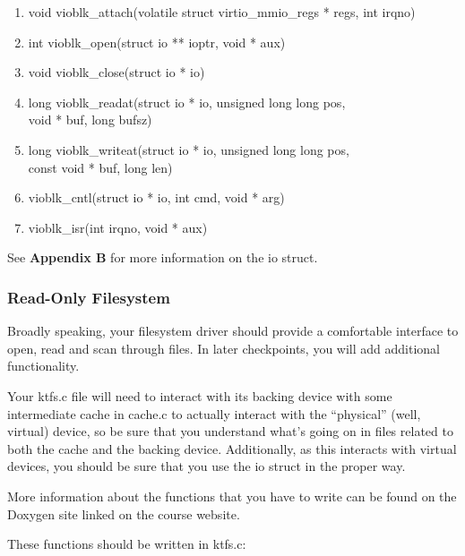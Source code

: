 \documentclass{article}
\begin{document}
	\begin{enumerate}

		\item{{\fix void vioblk\_attach(volatile struct virtio\_mmio\_regs * regs, int irqno)}}

		\item{{\fix int vioblk\_open(struct io ** ioptr, void * aux)}}

		\item{{\fix void vioblk\_close(struct io * io)}}

		\item{{\fix long vioblk\_readat(struct io * io, unsigned long long pos, \\
			void * buf, long bufsz)}}

		\item{{\fix long vioblk\_writeat(struct io * io, unsigned long long pos, \\
			const void * buf, long len)}}

		\item {{\fix vioblk\_cntl(struct io * io, int cmd, void * arg)}}

		\item{{\fix vioblk\_isr(int irqno, void * aux)}}

	\end{enumerate}

	See \textbf{Appendix B} for more information on the {\fix io} struct.

	\subsubsection{Read-Only Filesystem}
	Broadly speaking, your filesystem driver should provide a comfortable interface to open, read
	and scan through files. In later checkpoints, you will add additional functionality.

	Your {\fix ktfs.c} file will need to interact with its backing device with some intermediate cache in {\fix cache.c} to actually interact with the ``physical'' (well, virtual)
	device, so be sure that you understand what's going on in files related to both the cache and the backing device. Additionally, as this interacts
	with virtual devices, you should be sure that you use the {\fix io} struct in the proper way.

	More information about the functions that you have to write can be found on the Doxygen site linked on the course website.

	These functions should be written in {\fix ktfs.c}:
\end{document}
